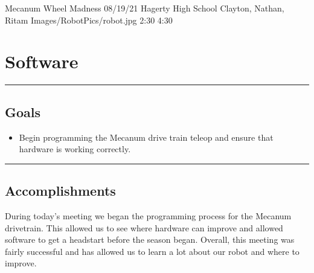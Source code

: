 \insertmeeting 
	{Mecanum Wheel Madness} 
	{08/19/21}
	{Hagerty High School}
	{Clayton, Nathan, Ritam}
	{Images/RobotPics/robot.jpg}
	{2:30}
  {4:30}
	
\section*{Software}
\noindent\hfil\rule{\textwidth}{.4pt}\hfil
\subsection*{Goals}
\begin{itemize}
    \item Begin programming the Mecanum drive train teleop and ensure that hardware is working correctly.

\end{itemize} 

\noindent\hfil\rule{\textwidth}{.4pt}\hfil

\subsection*{Accomplishments}
During today's meeting we began the programming process for the Mecanum drivetrain. This allowed us to see where hardware can improve and allowed software to get a headstart before the season began. Overall, this meeting was fairly successful and has allowed us to learn a lot about our robot and where to improve.